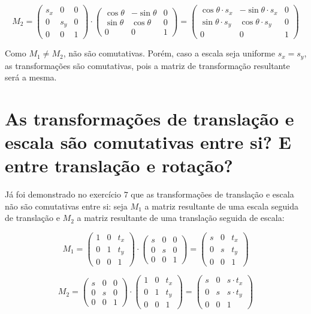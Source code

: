 \documentclass{article}
\begin{document}
$$M_2 = \begin{pmatrix}
	s_x & 0 & 0\\
	0 & s_y & 0\\
	0 & 0 & 1
\end{pmatrix} \cdot \begin{pmatrix}
\cos\theta & -\sin\theta & 0\\
\sin\theta & \cos\theta & 0\\
0 & 0 & 1
\end{pmatrix} = \begin{pmatrix}
\cos\theta \cdot s_x & -\sin\theta \cdot s_x & 0\\
\sin\theta \cdot s_y & \cos\theta \cdot s_y & 0\\
0 & 0 & 1
\end{pmatrix}$$

Como $M_1 \neq M_2$, não são comutativas. Porém, caso a escala seja uniforme $s_x = s_y$, as transformações são comutativas, pois a matriz de transformação resultante será a mesma.

\section{As transformações de translação e escala são comutativas entre si? E entre translação e rotação?}

Já foi demonstrado no exercício $7$ que as transformações de translação e escala não são comutativas entre si: seja $M_1$ a matriz resultante de uma escala seguida de translação e $M_2$ a matriz resultante de uma translação seguida de escala:

$$M_1 = \begin{pmatrix}
	1 & 0 & t_x\\
	0 & 1 & t_y\\
	0 & 0 & 1
\end{pmatrix}
\cdot
\begin{pmatrix}
	s & 0 & 0\\
	0 & s & 0\\
	0 & 0 & 1
\end{pmatrix}
=
\begin{pmatrix}
	s & 0 & t_x\\
	0 & s & t_y\\
	0 & 0 & 1
\end{pmatrix}
$$

$$M_2 = \begin{pmatrix}
	s & 0 & 0\\
	0 & s & 0\\
	0 & 0 & 1
\end{pmatrix}
\cdot
\begin{pmatrix}
	1 & 0 & t_x\\
	0 & 1 & t_y\\
	0 & 0 & 1
\end{pmatrix}
=
\begin{pmatrix}
	s & 0 & s \cdot t_x\\
	0 & s & s \cdot t_y\\
	0 & 0 & 1
\end{pmatrix}
$$
\end{document}
